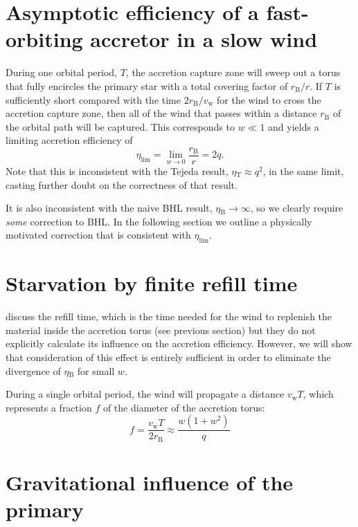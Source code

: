 \documentclass[useAMS, usenatbib, a4paper]{mnras}
\newcommand\wind{\ensuremath{_{\mathrm{w}}}}
\newcommand\bhl{\ensuremath{_{\mathrm{\scriptscriptstyle B}}}}
\newcommand\Tej{\ensuremath{_{\mathrm{\scriptscriptstyle T}}}}
\begin{document}
\section{Asymptotic efficiency of a fast-orbiting accretor in a slow wind}
\label{sec:fast-orbit-accr}

During one orbital period, \(T\),
the accretion capture zone will sweep out a torus that
fully encircles the primary star
with a total covering factor of \(r\bhl / r\).
If \(T\) is sufficiently short compared with the time \(2 r\bhl / v\wind\) for the wind to cross the accretion capture zone, then all of the wind that passes within
a distance \(r\bhl\) of the orbital path will be captured.
This corresponds to \(w \ll 1\) and yields a limiting accretion efficiency of
\begin{equation}
  \label{eq:1}
  \eta_{\lim} = \lim_{w \to 0} \frac{r\bhl}{r} = 2 q .
\end{equation}
Note that this is inconsistent with the Tejeda result,
\(\eta\Tej \approx q^2\), in the same limit, casting further doubt on
the correctness of that result.

It is also inconsistent with the naive BHL result, \(\eta\bhl \to \infty\),
so we clearly require \emph{some} correction to BHL.
In the following section we outline a physically motivated correction
that is consistent with \(\eta_{\lim}\).

\section{Starvation by finite refill time}
\label{sec:starv-finite-refill}
\cite{Tejeda:2025a} discuss the refill time, which is the time
needed for the wind to replenish the material inside the accretion torus
(see previous section)
but they do not explicitly calculate its influence on the accretion efficiency.
However, we will show that consideration of this effect is
entirely sufficient in order to eliminate
the divergence of \(\eta\bhl\) for small \(w\).

During a single orbital period, the wind will propagate a distance \(v\wind T\),
which represents a fraction \(f\) of the diameter of the accretion torus:
\begin{equation}
  \label{eq:refill-fraction}
  f = \frac{v\wind T}{2 r\bhl} \approx \frac{w (1 + w^2)}{q}
\end{equation}


\section{Gravitational influence of the primary}
\label{sec:limit-hill-sphere}








\bsp	%
\label{lastpage}
\end{document}
